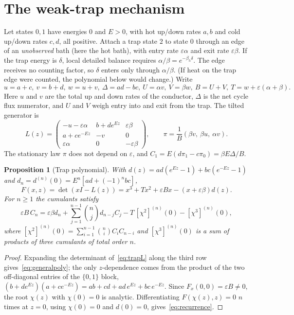 \documentclass[11pt,a4paper]{article}
\newtheorem{proposition}[theorem]{Proposition}
\theoremstyle{remark}\newtheorem{remark}[theorem]{Remark}
\newcommand{\eps}{\varepsilon}
\begin{document}
\section{The weak-trap mechanism}\label{sec:trap}
Let states $0,1$ have energies $0$ and $E>0$, with hot up/down rates $a,b$ and cold up/down rates $c,d$, all positive. Attach a trap state $2$ to state $0$ through an edge of an \emph{unobserved} bath (here the hot bath), with entry rate $\eps\alpha$ and exit rate $\eps\beta$. If the trap energy is $\delta$, local detailed balance requires $\alpha/\beta=e^{-\beta_h\delta}$. The edge receives no counting factor, so $\delta$ enters only through $\alpha/\beta$. (If heat on the trap edge were counted, the polynomial below would change.) Write
\begin{equation}
u=a+c,\ v=b+d,\ w=u+v,\ \Delta=ad-bc,\ U=\alpha v,\ V=\beta w,\ B=U+V,\ T=w+\eps(\alpha+\beta).
\end{equation}
Here $u$ and $v$ are the total up and down rates of the conductor, $\Delta$ is the net cycle flux numerator, and $U$ and $V$ weigh entry into and exit from the trap. The tilted generator is
\begin{equation}\label{eq:trapL}
L(z)=\begin{pmatrix}-u-\eps\alpha&b+de^{Ez}&\eps\beta\\a+ce^{-Ez}&-v&0\\\eps\alpha&0&-\eps\beta\end{pmatrix},
\qquad \pi=\frac{1}{B}(\beta v,\ \beta u,\ \alpha v).
\end{equation}
The stationary law $\pi$ does not depend on $\eps$, and $C_1=E(d\pi_1-c\pi_0)=\beta E\Delta/B$.

\begin{proposition}[Trap polynomial]\label{prop:trap}
With $d(z)=ad(e^{Ez}-1)+bc(e^{-Ez}-1)$ and $d_n=d^{(n)}(0)=E^n[ad+(-1)^nbc]$,
\begin{equation}\label{eq:generalpoly}
F(x,z)=\det(xI-L(z))=x^3+Tx^2+\eps Bx-(x+\eps\beta)d(z).
\end{equation}
For $n\ge1$ the cumulants satisfy
\begin{equation}\label{eq:recurrence}
\eps B\,C_n=\eps\beta d_n+\sum_{j=1}^{n-1}\binom nj d_{n-j}C_j-T\,[\chi^2]^{(n)}(0)-[\chi^3]^{(n)}(0),
\end{equation}
where $[\chi^2]^{(n)}(0)=\sum_{i=1}^{n-1}\binom ni C_iC_{n-i}$ and $[\chi^3]^{(n)}(0)$ is a sum of products of three cumulants of total order $n$.
\end{proposition}
\begin{proof}
Expanding the determinant of~\eqref{eq:trapL} along the third row gives~\eqref{eq:generalpoly}; the only $z$-dependence comes from the product of the two off-diagonal entries of the $\{0,1\}$ block, $(b+de^{Ez})(a+ce^{-Ez})=ab+cd+ad\,e^{Ez}+bc\,e^{-Ez}$. Since $F_x(0,0)=\eps B\ne0$, the root $\chi(z)$ with $\chi(0)=0$ is analytic. Differentiating $F(\chi(z),z)=0$ $n$ times at $z=0$, using $\chi(0)=0$ and $d(0)=0$, gives~\eqref{eq:recurrence}.
\end{proof}
\end{document}
